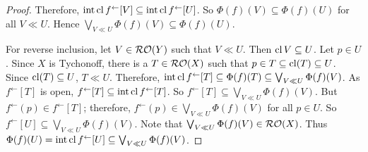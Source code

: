 \begin{proof}
		Therefore, \( \operatorname{int}\operatorname{cl}{f^\leftarrow[V]} \subseteq \operatorname{int}\operatorname{cl}{f^\leftarrow[U]} \).  So \( \Phi(f)(V) \subseteq \Phi(f)(U) \) for all \( V \ll U \).  Hence \( \bigvee_{V \ll U} \Phi(f)(V) \subseteq \Phi(f)(U) \).
	
		For reverse inclusion, let \( V \in \operatorname{\mathcal{RO}}(Y) \) such that \( V \ll U \).  Then \( \operatorname{cl}{V} \subseteq U \).  Let \( p \in U \).  Since \( X \) is Tychonoff, there is a \( T \in \operatorname{\mathcal{RO}}(X) \) such that \( p \in T \subseteq \operatorname{cl}(T) \subseteq U \).  Since \( \operatorname{cl}(T) \subseteq U \), \( T \ll U \).  Therefore, \( \operatorname{int}\operatorname{cl}{f^\leftarrow[T]} \subseteq \Phi(f)(T) \subseteq \bigvee_{V \ll U} \Phi(f)(V) \).  As \( f^\leftarrow[T] \) is open, \( f^\leftarrow[T] \subseteq \operatorname{int}\operatorname{cl}{f^\leftarrow[T]} \).  So \( f^\leftarrow[T] \subseteq \bigvee_{V \ll U} \Phi(f)(V) \).  But \( f^\leftarrow(p) \in f^\leftarrow[T] \); therefore, \( f^\leftarrow(p) \in \bigvee_{V \ll U} \Phi(f)(V) \) for all \( p \in U \).  So \( f^\leftarrow[U] \subseteq \bigvee_{V \ll U} \Phi(f)(V) \).  Note that \( \bigvee_{V \ll U} \Phi(f)(V) \in \operatorname{\mathcal{RO}}(X) \).  Thus \( \Phi(f)(U) = \operatorname{int}\operatorname{cl}{f^\leftarrow[U]} \subseteq \bigvee_{V \ll U} \Phi(f)(V) \).
\end{proof}

